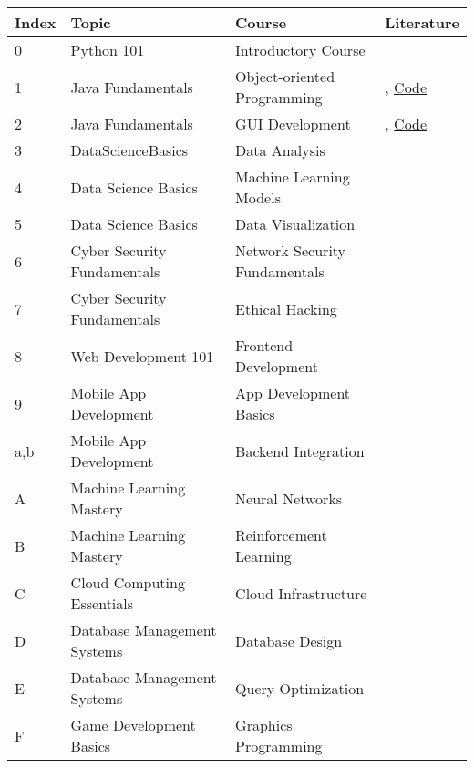 \begin{tabular}{llll}
  Index & Topic  & Course  & Literature \\
  \hline   
  0  & Python 101  &  Introductory Course  &  \cite{smithPython101Introduction2023a, smithPython101Advanced2023} \\
  1  & Java Fundamentals  & Object-oriented Programming & \cite{jonesJavaFundamentalsBeginners2023}, \href{https://github.com/example/JavaFundamentals}{Code} \\
  2  & Java Fundamentals &  GUI Development & \cite{jonesJavaFundamentalsBeginners2023}, \href{https://github.com/example/JavaFundamentals}{Code} \\
  
  3 & DataScienceBasics &  Data Analysis   & \cite{brownDataScienceBasics2023}  \\

  4 & Data Science Basics &  Machine Learning Models  &  \cite{brownDataScienceBasics2023}  \\
  5 & Data Science Basics &  Data Visualization  &  \cite{brownDataScienceBasics2023}  \\
  
  6 & Cyber Security Fundamentals &  Network Security Fundamentals  & \cite{wilsonCyberSecurityFundamentals2023} \\
  7 & Cyber Security Fundamentals &  Ethical Hacking     & \cite{wilsonCyberSecurityFundamentals2023} \\
  
  8 & Web Development 101 &  Frontend Development  & \cite{johnsonWebDevelopment1012023} \\

  9 & Mobile App Development &  App Development Basics    & \cite{thomasMobileAppDevelopmentBasics2023} \\
  a,b & Mobile App Development &  Backend Integration   & \cite{thomasMobileAppDevelopmentBasics2023} \\
  

   \hline
   \hline
   A & Machine Learning Mastery &   Neural Networks  &  \cite{wilsonMachineLearningMastery2023} \\
   B & Machine Learning Mastery &   Reinforcement Learning    &  \cite{wilsonMachineLearningMastery2023} \\
  
   C & Cloud Computing Essentials & Cloud Infrastructure &  \cite{leeCloudComputingEssentials2023}\\
  D & Database Management Systems & Database Design  & \cite{adamsDatabaseManagementSystems2023} \\
  E & Database Management Systems & Query Optimization & \cite{adamsDatabaseManagementSystems2023} \\
  F & Game Development Basics & Graphics Programming & \cite{martinezGameDevelopmentBasics2023}  \\



\end{tabular}
